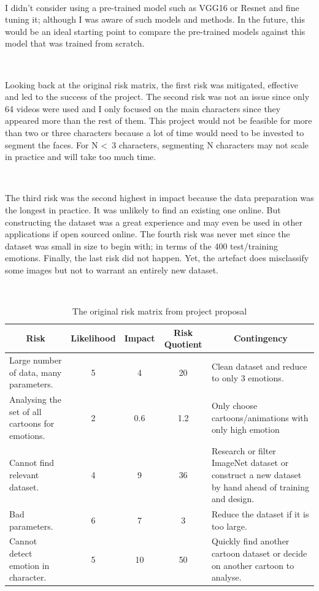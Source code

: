 \documentclass[report, 11pt, oneside]{dissertation}
\begin{document}
\ \

I didn't consider using a pre-trained model such as VGG16 or Resnet and fine tuning it; although I was aware of such models and methods. In the future, this would be an ideal starting point to compare the pre-trained models against this model that was trained from scratch.

\ \

 Looking back at the original risk matrix, the first risk was mitigated, effective and led to the success of the project. The second risk was not an issue since only 64 videos were used and I only focused on the main characters since they appeared more than the rest of them. This project would not be feasible for more than two or three characters because a lot of time would need to be invested to segment the faces. For N \textless \  3 characters, segmenting N characters may not scale in practice and will take too much time. 
 
 \ \
 
 The third risk was the second highest in impact because the data preparation was the longest in practice. It was unlikely to find an existing one online. But constructing the dataset was a great experience and may even be used in other applications if open sourced online. The fourth risk was never met since the dataset was small in size to begin with; in terms of the 400 test/training emotions. Finally, the last risk did not happen. Yet, the artefact does misclassify some images but not to warrant an entirely new dataset. 
 
 \ \
 
\begin{table}[H]
\centering
\begin{tabularx}{\linewidth}{|X|c|c|c|X|}
\hline \multicolumn{1}{|c|}{Risk} & \multicolumn{1}{c|}{Likelihood} & \multicolumn{1}{c|}{Impact} & \multicolumn{1}{c|}{Risk Quotient}  & \multicolumn{1}{|c|}{Contingency}  \tabularnewline \hline
Large number of data, many parameters.         & 5            & 4   & 20 & Clean dataset and reduce to only 3 emotions.        			 \tabularnewline \hline
Analysing the set of all cartoons for emotions.         & 2            & 0.6   & 1.2 & Only choose cartoons/animations with only high emotion         \tabularnewline \hline
Cannot find relevant dataset.         & 4            & 9   & 36 & Research or filter ImageNet dataset or construct a new dataset by hand ahead of training and design.         \tabularnewline \hline
Bad parameters.         & 6            & 7   & 3 & Reduce the dataset if it is too large.         \tabularnewline \hline
Cannot detect emotion in character.         & 5            & 10   & 50 & Quickly find another cartoon dataset or decide on another cartoon to analyse.         \tabularnewline \hline


\end{tabularx}
\caption{The original risk matrix from project proposal}
\label{tab:risk_matrix}
\end{table}
\end{document}
